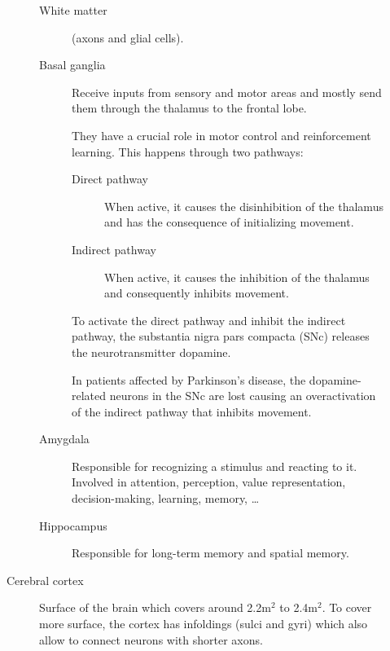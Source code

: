 \begin{description}
\begin{description}
\begin{description}
                \item[White matter] 
                    (axons and glial cells).

                \item[Basal ganglia] 
                    Receive inputs from sensory and motor areas and 
                    mostly send them through the thalamus to the frontal lobe.

                    They have a crucial role in motor control and reinforcement learning.
                    This happens through two pathways:
                    \begin{description}
                        \item[Direct pathway] When active, it causes the disinhibition of the thalamus and has the consequence of initializing movement.
                        \item[Indirect pathway] When active, it causes the inhibition of the thalamus and consequently inhibits movement.
                    \end{description}
                    To activate the direct pathway and inhibit the indirect pathway, the substantia nigra pars compacta (SNc) releases the neurotransmitter dopamine.

                    \begin{example}
                        In patients affected by Parkinson's disease, the dopamine-related neurons in the SNc are lost causing
                        an overactivation of the indirect pathway that inhibits movement.
                    \end{example}

                \item[Amygdala] 
                    Responsible for recognizing a stimulus and reacting to it.
                    Involved in attention, perception, value representation, decision-making, learning, memory, \dots

                \item[Hippocampus] 
                    Responsible for long-term memory and spatial memory.
            \end{description}

        \item[Cerebral cortex] 
            Surface of the brain which covers around 2.2m$^2$ to 2.4m$^2$.
            To cover more surface, the cortex has infoldings (sulci and gyri) which also allow to connect neurons with shorter axons.


\end{description}
\end{description}
